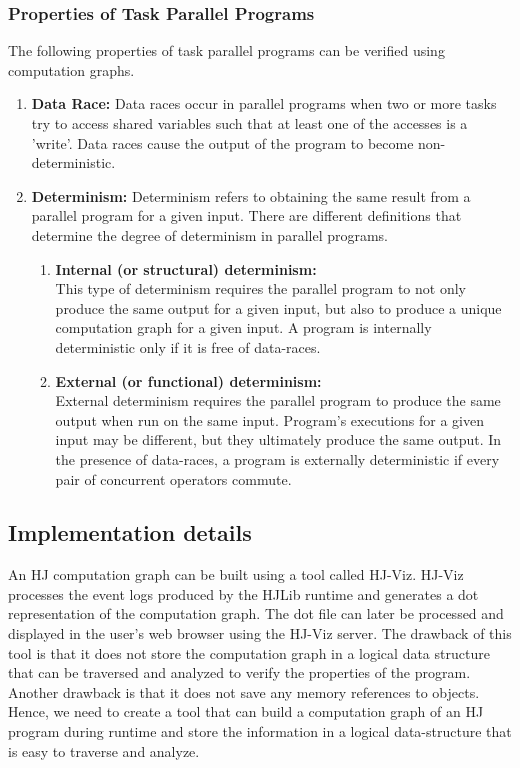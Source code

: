 \subsubsection{Properties of Task Parallel Programs}
The following properties of task parallel programs can be verified using computation graphs.

\begin{enumerate}
\item
\textbf{Data Race:}
Data races occur in parallel programs when two or more tasks try to access shared variables such that at least one of the accesses is a 'write'. Data races cause the output of the program to become non-deterministic. 
\item
\textbf{Determinism:}
Determinism refers to obtaining the same result from a parallel program for a given input. There are different definitions that determine the degree of determinism in parallel programs.
\begin{enumerate}
\item
\textbf{Internal (or structural) determinism:\\}
This type of determinism requires the parallel program to not only produce the same output for a given input, but also to produce a unique computation graph for a given input. A program is internally deterministic only if it is free of data-races.
\item
\textbf{External (or functional) determinism:\\}
External determinism requires the parallel program to produce the same output when run on the same input. Program's executions for a given input may be different, but they ultimately produce the same output. In the presence of data-races, a program is externally deterministic if every pair of concurrent operators commute.
\end{enumerate}
\end{enumerate}

\subsection{Implementation details}
An HJ computation graph can be built using a tool called HJ-Viz. HJ-Viz processes the event logs produced by the HJLib runtime and generates a dot representation of the computation graph. The dot file can later be processed and displayed in the user's web browser using the HJ-Viz server. The drawback of this tool is that it does not store the computation graph in a logical data structure that can be traversed and analyzed to verify the properties of the program. Another drawback is that it does not save any memory references to objects. Hence, we need to create a tool that can build a computation graph of an HJ program during runtime and store the information in a logical data-structure that is easy to traverse and analyze.

